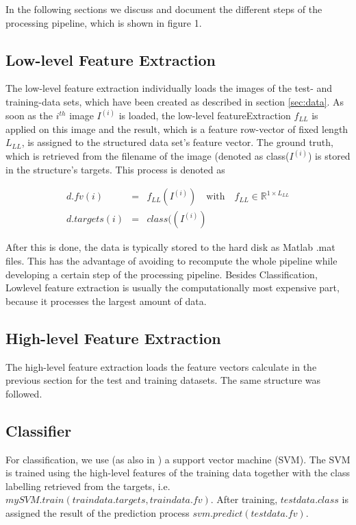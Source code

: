 \documentclass[10pt,twocolumn,letterpaper]{article}
\begin{document}
In the following sections we discuss and document the different steps of the processing pipeline, which is shown in figure 1.

\subsection{Low-level Feature Extraction}
The low-level feature extraction individually loads the images of the test- and training-data sets, which have been created as described in section \ref{sec:data}. As soon as the $i^{th}$ image $I^{(i)}$ is loaded, the low-level featureExtraction $f_{LL}$ is applied on this image and the result, which is a feature row-vector of fixed length $L_{LL}$, is assigned to the structured data set's feature vector. The ground truth, which is retrieved from the filename of the image (denoted as class($I^{(i)}$) is stored in the structure's targets. This process is denoted as 

\begin{small}

\begin{eqnarray}
d.fv(i) & = & f_{LL}(I^{(i)}) \quad \text{with} \quad f_{LL} \in \mathbb{R}^{1 \times L_{LL}} \\
d.targets(i)& = &class((I^{(i)})
\end{eqnarray}  

\end{small}

After this is done, the data is typically stored to the hard disk as Matlab .mat files. This has the advantage of avoiding to recompute the whole pipeline while developing a certain step of the processing pipeline. Besides Classification, Lowlevel feature extraction is usually the computationally most expensive part, because it processes the largest amount of data.
\subsection{High-level Feature Extraction}
The high-level feature extraction loads the feature vectors calculate in the previous section for the test and training datasets. The same structure was followed.


\subsection{Classifier}
For classification, we use (as also in \cite{indoorScenes}) a support vector machine (SVM). The SVM is trained using the high-level features of the training data together with the class labelling retrieved from the targets, i.e. $mySVM.train(traindata.targets, traindata.fv)$. After training, $testdata.class$ is assigned the result of the prediction process $svm.predict(testdata.fv)$. 
\end{document}
